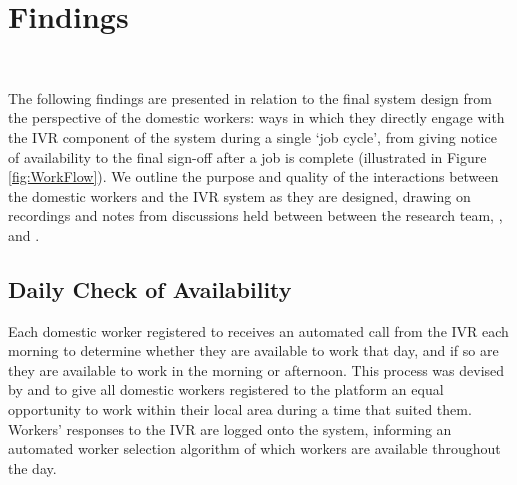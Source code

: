 \section{Findings}

\begin{figure*}
  \centering
  
  \caption{The \PC{} IVR system, as encountered by a domestic worker. (1) The system calls the worker in the morning to ascertain if they want to work, and if so when. (2) The client requests a worker through the smartphone app. \PC{}'s algorithm chooses a suitable worker and rings them to see if they will take the order. If so, the worker is asked to wait while \PC{} check if the order is genuine. The worker receives a second confirmation call from the system, and if the job is genuine is then asked to give an ETA and leave towards the client's house. (3) During the journey, the worker is called up three times to get an updated ETA. (4) At the client's house, the worker calls the system to log when the work is started and finished. (5) After finishing, the worker waits at the client's house until an automated SMS arrives confirming that the client has paid. At any time, the worker can call the system to get information about a current job or their wages, get help from the \PC{} office or emergency services, or to contact the client. }~\label{fig:WorkFlow}
\end{figure*}

The following findings are presented in relation to the final \PC{} system design from the perspective of the domestic workers: ways in which they directly engage with the IVR component of the system during a single `job cycle', from giving notice of availability to the final sign-off after a job is complete (illustrated in Figure \ref{fig:WorkFlow}). We outline the purpose and quality of the interactions between the domestic workers and the IVR system as they are designed, drawing on recordings and notes from discussions held between between the research team, \PC{}, and \NGO{}.

\subsection{Daily Check of Availability}

Each domestic worker registered to \PC{} receives an automated call from the IVR each morning to determine whether they are available to work that day, and if so are they are available to work in the morning or afternoon. This process was devised by \PC{} and \NGO{} to give all domestic workers registered to the platform an equal opportunity to work within their local area during a time that suited them. Workers' responses to the IVR are logged onto the \PC{} system, informing an automated worker selection algorithm of which workers are available throughout the day. 

